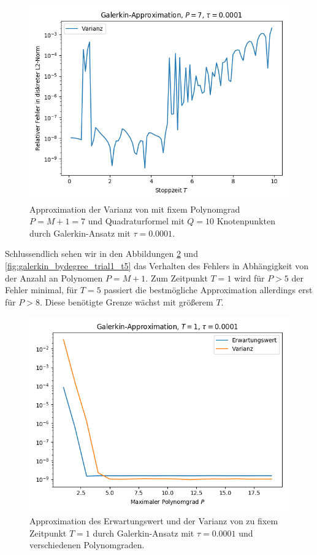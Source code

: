\begin{figure}[!htb]
\centering
\includegraphics[width=0.75\linewidth]{Figures/galerkin_bystoptime_trial1_fixedlowdegree.png}
\caption{Approximation der Varianz von  mit fixem Polynomgrad $P=M+1=7$ und Quadraturformel mit $Q=10$ Knotenpunkten durch Galerkin-Ansatz mit $\tau=0.0001$.}
\label{fig:galerkin_bystoptime_trial1_low}
\end{figure}
Schlussendlich sehen wir in den Abbildungen \ref{fig:galerkin_bydegree_trial1_t1} und \ref{fig:galerkin_bydegree_trial1_t5} das Verhalten des Fehlers in Abhängigkeit von der Anzahl an Polynomen $P=M+1$. Zum Zeitpunkt $T=1$ wird für $P>5$ der Fehler minimal, für $T=5$ passiert die bestmögliche Approximation allerdings erst für $P>8$. Diese benötigte Grenze wächst mit größerem $T$. 
\begin{figure}[!htb]
\centering
\includegraphics[width=0.5\linewidth]{Figures/galerkin_bydegree_trial1_t1.png}
\caption{Approximation des Erwartungswert und der Varianz von  zu fixem Zeitpunkt $T=1$ durch Galerkin-Ansatz mit $\tau=0.0001$ und verschiedenen Polynomgraden.}
\label{fig:galerkin_bydegree_trial1_t1}
\end{figure}
